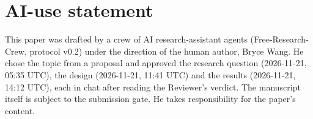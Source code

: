 \section*{AI-use statement}

This paper was drafted by a crew of AI research-assistant agents
(Free-Research-Crew, protocol v0.2) under the direction of the human author, Bryce Wang.
He chose the topic from a proposal and approved the research question (2026-11-21, 05:35
UTC), the design (2026-11-21, 11:41 UTC) and the results (2026-11-21, 14:12 UTC), each in
chat after reading the Reviewer's verdict. The manuscript itself is subject to the
submission gate. He takes responsibility for the paper's content.

